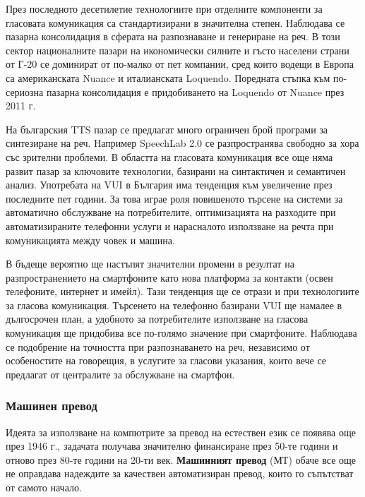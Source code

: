 \documentclass[]{../../metanetpaper}
\begin{document}
\begin{multicols}{2}
През последното десетилетие технологиите при отделните компоненти за гласовата комуникация са стандартизирани в значителна степен. Наблюдава се пазарна консолидация в сферата на разпознаване и генериране на реч. В този сектор националните пазари на икономически силните и гъсто населени страни от Г-20 се доминират от по-малко от пет компании, сред които водещи в Европа са американската Nuance и италианската Loquendo. Поредната стъпка към по-сериозна пазарна консолидация  е придобиването на Loquendo от Nuance през 2011 г.

На българския TTS пазар се предлагат много ограничен брой програми за синтезиране на реч. Например SpeechLab 2.0 се разпространява свободно за хора със зрителни проблеми. В областта на  гласовата комуникация все още няма развит пазар за ключовите технологии, базирани на синтактичен и семантичен анализ.
Употребата на VUI в България има тенденция към увеличение през последните пет години. За това играе роля повишеното търсене на системи за автоматично
 обслужване на потребителите, оптимизацията на
 разходите при автоматизираните телефонни услуги и
 нарасналото използване на речта при комуникацията между човек и
машина.

В бъдеще вероятно ще настъпят значителни промени в
 резултат на разпространението на смартфоните като
 нова платформа за контакти (освен телефоните, интернет и имейл).
Тази тенденция ще се отрази и при технологиите за
 гласова комуникация. Търсенето на
 телефонно базирани VUI ще намалее в дългосрочен
 план, а удобното за потребителите използване на гласова комуникация ще придобива все по-голямо значение при смартфоните. Наблюдава се подобрение на
 точността при разпознаването на реч, независимо от особеностите на
 говорещия, в услугите за гласови указания, които вече се предлагат от централите за обслужване на смартфон.

\subsubsection{Машинен превод}

Идеята за използване на компютрите за превод
 на естествен език се появява още през 1946 г.,
 задачата получава значително финансиране през 50-те години и отново през 80-те години на 20-ти век. \textbf{Машинният превод} (МТ) обаче все още не оправдава надеждите за качествен автоматизиран превод, които го съпътстват от самото начало.



\end{multicols}
\end{document}
